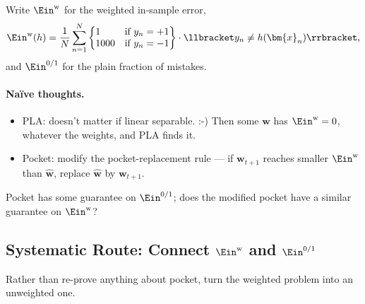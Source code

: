 Write \(\Ein^{\mathrm{w}}\) for the weighted in-sample error,
\[
    \Ein^{\mathrm{w}}(h) = \frac{1}{N} \sum_{n=1}^N
    \left\{ \begin{array}{@{}ll@{}}
        1 & \text{if } y_n = +1\\
        1000 & \text{if } y_n = -1
    \end{array} \right\} \cdot \llbracket y_n \neq h(\bm{x}_n) \rrbracket ,
\]
and \(\Ein^{0/1}\) for the plain fraction of mistakes.

\paragraph{Naïve thoughts.}
\begin{itemize}
    \item PLA: doesn't matter if linear separable. :-) Then some \(\bm{w}\)
        has \(\Ein^{\mathrm{w}} = 0\), whatever the weights, and PLA finds it.
    \item Pocket: modify the pocket-replacement rule --- if \(\bm{w}_{t+1}\)
        reaches smaller \(\Ein^{\mathrm{w}}\) than \(\hat{\bm{w}}\), replace
        \(\hat{\bm{w}}\) by \(\bm{w}_{t+1}\).
\end{itemize}

\begin{question}
    Pocket has some guarantee on \(\Ein^{0/1}\); does the modified pocket have
    a similar guarantee on \(\Ein^{\mathrm{w}}\)?
\end{question}

\subsection{Systematic Route: Connect
\texorpdfstring{\(\Ein^{\mathrm{w}}\)}{Einw} and
\texorpdfstring{\(\Ein^{0/1}\)}{Ein01}}

Rather than re-prove anything about pocket, turn the weighted problem into an
unweighted one.

